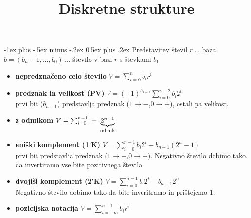 \documentclass[a4paper,10pt]{extarticle}
\title{Diskretne strukture}
\makeatletter
\renewcommand{\section}{\@startsection{section}{1}{0mm}%
                                {-1ex plus -.5ex minus -.2ex}%
                                {0.5ex plus .2ex}%
                                {\normalfont\large\bfseries}}
\makeatother
\begin{document}
\raggedright
\footnotesize
\begin{multicols}{3}
\section{Predstavitev števil}
$r\ \dots $ baza\\
$b = (b_n-1, ..., b_0)\ \dots $ število v bazi $r$ s števkami $b_1$\\ 
\begin{itemize}
    \item \textbf{nepredznačeno celo število}
    $V = \sum_{i=0}^{n}b_ir^i$
    \item \textbf{predznak in velikost (PV)} 
    $V = (-1)^{b_{n-1}} \sum_{i=0}^{n-2} b_i2^i$ \\
    prvi bit ($b_{n-1}$) predstavlja predznak ($1\to -$,$0 \to +$), ostali pa velikost.
    \item \textbf{z odmikom}
    $V = \sum_{i=0}^{n-1} \ -\ \underbrace{2^{n-1}}_\textmd{odmik}$ \\
    \item \textbf{eniški komplement (1'K)}
    $V = \sum_{i=0}^{n-1} b_i 2^i - b_{n-1}(2^n-1) $ \\
    prvi bit predstavlja predznak ($1\to -$,$0 \to +$). Negativno število dobimo tako, da invertiramo vse bite pozitivnega števila.
    \item \textbf{dvojiši komplement (2'K)}
    $V = \sum_{i=0}^{n-1} b_i 2^i - b_{n-1}2^n$ \\
    Negativno število dobimo tako da bite inveritramo in prištejemo 1.
    \item \textbf{pozicijska notacija}
    $V = \sum_{i=-m}^{n-1}b_ir^i$
\end{itemize}

\end{multicols}
\end{document}
